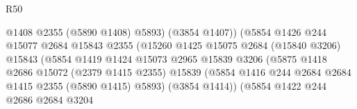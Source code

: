 \begin{lexlean}{R50}
\begin{coremodule}
                                              @1408
                                              @2355
                                              (@5890 @1408)
                                              @5893)
                                            (@3854 @1407))
                                          (@5854
                                            @1426
                                            @244
                                            @15077
                                            @2684
                                            @15843
                                            @2355
                                            (@15260
                                              @1425
                                              @15075
                                              @2684
                                              (@15840 @3206)
                                              @15843
                                              (@5854
                                                @1419
                                                @1424
                                                @15073
                                                @2965
                                                @15839
                                                @3206
                                                (@5875
                                                  @1418
                                                  @2686
                                                  @15072
                                                  (@2379 @1415 @2355)
                                                  @15839
                                                  (@5854
                                                    @1416
                                                    @244
                                                    @2684
                                                    @2684
                                                    @1415
                                                    @2355
                                                    (@5890 @1415)
                                                    @5893)
                                                  (@3854 @1414))
                                                (@5854
                                                  @1422
                                                  @244
                                                  @2686
                                                  @2684
                                                  @3204

\end{coremodule}
\end{lexlean}
